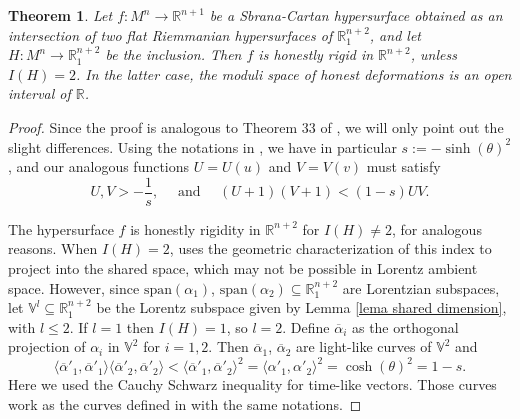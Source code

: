 \documentclass{article}
\newtheorem{thm}{Theorem}[section]
\theoremstyle{remark}
\begin{document}
\begin{thm}\label{deforamciones de las intersecciones en lorentz}
    Let $f:M^n\rightarrow\mathbb{R}^{n+1}$ be a Sbrana-Cartan hypersurface obtained as an intersection of two flat Riemmanian hypersurfaces of $\mathbb{R}^{n+2}_1$, and let $H:M^n\rightarrow\mathbb{R}^{n+2}_1$ be the inclusion. Then $f$ is honestly rigid in $\mathbb{R}^{n+2}$, unless $I(H)=2$. In the latter case, the moduli space of honest deformations is an open interval of $\mathbb{R}$.
\end{thm}
\begin{proof}
    Since the proof is analogous to Theorem 33 of \cite{FF}, we will only point out the slight differences.
    Using the notations in \cite{FF}, we have in particular $s:=-\sinh(\theta)^2$, and our analogous functions $U=U(u)$ and $V=V(v)$ must satisfy
    \begin{equation}\label{desigualdades de U y V}
        U,V>-\frac{1}{s},\quad\text{ and }\quad (U+1)(V+1)<(1-s)UV.
    \end{equation}
    
    The hypersurface $f$ is honestly rigidity in $\mathbb{R}^{n+2}$ for $I(H)\neq 2$, for analogous reasons. 
    When $I(H)=2$, \cite{FF} uses the geometric characterization of this index to project into the shared space, which may not be possible in Lorentz ambient space. However, since $\text{span}(\alpha_1)$, $\text{span}(\alpha_2)\subseteq\mathbb{R}^{n+2}_1$ are Lorentzian subspaces, let $\mathbb{V}^l\subseteq\mathbb{R}^{n+2}_1$ be the Lorentz subspace given by Lemma \ref{lema shared dimension}, with $l\leq 2$. If $l=1$ then $I(H)=1$, so $l=2$. 
    Define $\overline{\alpha}_i$ as the orthogonal projection of $\alpha_i$ in $\mathbb{V}^2$ for $i=1,2$. 
    Then $\overline{\alpha}_1$, $\overline{\alpha}_2$ are light-like curves of $\mathbb{V}^2$ and 
    \begin{equation}\label{dsds}
        \langle\overline{\alpha}'_1,\overline{\alpha}'_1\rangle \langle\overline{\alpha}'_2,\overline{\alpha}'_2\rangle< \langle\overline{\alpha}'_1,\overline{\alpha}'_2\rangle^2=\langle\alpha'_1,\alpha'_2\rangle^2=\cosh(\theta)^2=1-s.
    \end{equation}
    Here we used the Cauchy Schwarz inequality for time-like vectors. Those curves work as the curves defined in \cite{FF} with the same notations.
    

\end{proof}
\end{document}
